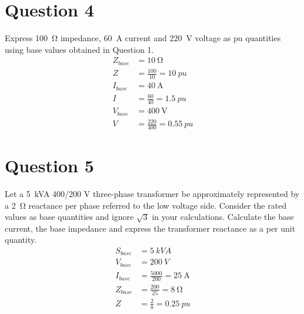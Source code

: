 \section{Question 4}
Express \SI{100}{\ohm} impedance, \SI{60}{\ampere} current and \SI{220}{\volt} voltage as pu quantities using base values obtained in Question 1.
\begin{align}
    Z_{base} & = \SI{10}{\ohm}                   \\
    Z        & = \frac{100}{10} = \SI{10}{pu}    \\
    I_{base} & = \SI{40}{\ampere}                \\
    I        & = \frac{60}{40} = \SI{1.5}{pu}    \\
    V_{base} & = \SI{400}{\volt}                 \\
    V        & = \frac{220}{400} = \SI{0.55}{pu}
\end{align}
\section{Question 5}
Let a \SI{5}{kVA} 400/200 V three-phase transformer be approximately represented by a \SI{2}{\ohm} reactance per phase referred to the low voltage side. Consider the rated values as base quantities and ignore $\sqrt{3}$ in your calculations. Calculate the base current, the base impedance and express the transformer reactance as a per unit quantity.
\begin{align}
    S_{base} & = \SI{5}{kVA}                         \\
    V_{base} & = \SI{200}{V}                         \\
    I_{base} & = \frac{5000}{200} = \SI{25}{\ampere} \\
    Z_{base} & = \frac{200}{25} = \SI{8}{\ohm}       \\
    Z        & = \frac{2}{8} = \SI{0.25}{pu}
\end{align}
